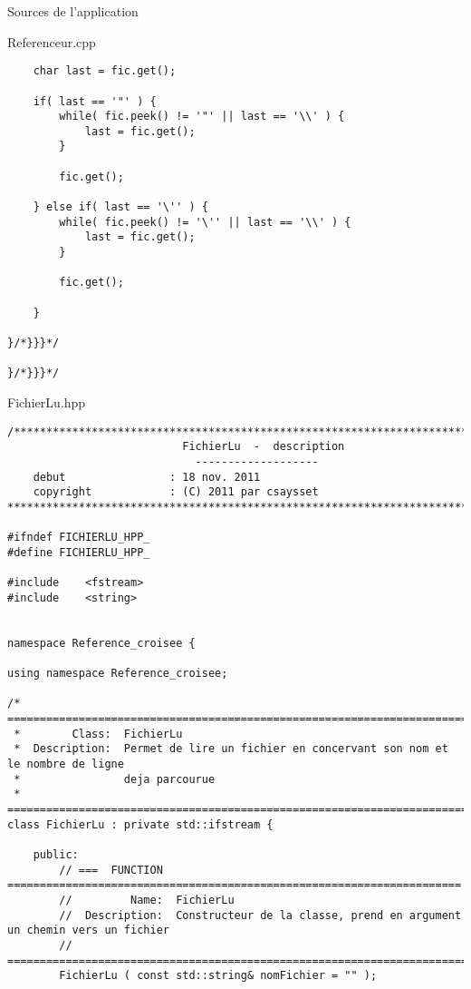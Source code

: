 \documentclass{article}
\begin{document}
\begin{section}{Sources de l'application}
\begin{paragraph}{Referenceur.cpp}
\begin{verbatim}
    char last = fic.get();

    if( last == '"' ) {
        while( fic.peek() != '"' || last == '\\' ) {
            last = fic.get();
        }

        fic.get();

    } else if( last == '\'' ) {
        while( fic.peek() != '\'' || last == '\\' ) {
            last = fic.get();
        }

        fic.get();

    }

}/*}}}*/

}/*}}}*/
  \end{verbatim}
  \end{paragraph}





\newpage
  \begin{paragraph}{FichierLu.hpp}
   \begin{verbatim}
/*************************************************************************
                           FichierLu  -  description
                             -------------------
    debut                : 18 nov. 2011
    copyright            : (C) 2011 par csaysset
*************************************************************************/

#ifndef FICHIERLU_HPP_
#define FICHIERLU_HPP_

#include    <fstream>
#include    <string>


namespace Reference_croisee {

using namespace Reference_croisee;

/* =====================================================================================
 *        Class:  FichierLu
 *  Description:  Permet de lire un fichier en concervant son nom et le nombre de ligne
 *                deja parcourue
 * =====================================================================================*/
class FichierLu : private std::ifstream {

    public:
        // ===  FUNCTION  ======================================================================
        //         Name:  FichierLu
        //  Description:  Constructeur de la classe, prend en argument un chemin vers un fichier
        // =====================================================================================
        FichierLu ( const std::string& nomFichier = "" );






\end{verbatim}
\end{paragraph}
\end{section}
\end{document}
